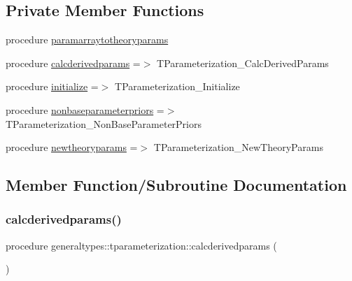 \subsection*{Private Member Functions}
\begin{DoxyCompactItemize}
\item 
procedure \mbox{\hyperlink{structgeneraltypes_1_1tparameterization_a1edd08d8a22408f2ed61517beb259921}{paramarraytotheoryparams}}
\item 
procedure \mbox{\hyperlink{structgeneraltypes_1_1tparameterization_aeb8d1b924224aecd75769d4e9c7a6d29}{calcderivedparams}} =$>$ T\+Parameterization\+\_\+\+Calc\+Derived\+Params
\item 
procedure \mbox{\hyperlink{structgeneraltypes_1_1tparameterization_ac80176866570455f25958f6d4302336d}{initialize}} =$>$ T\+Parameterization\+\_\+\+Initialize
\item 
procedure \mbox{\hyperlink{structgeneraltypes_1_1tparameterization_a7130cffde1b01791c29c0b081bd4cb5f}{nonbaseparameterpriors}} =$>$ T\+Parameterization\+\_\+\+Non\+Base\+Parameter\+Priors
\item 
procedure \mbox{\hyperlink{structgeneraltypes_1_1tparameterization_a935b504c18c4f342a4ed612364e829aa}{newtheoryparams}} =$>$ T\+Parameterization\+\_\+\+New\+Theory\+Params
\end{DoxyCompactItemize}


\subsection{Member Function/\+Subroutine Documentation}
\mbox{\label{structgeneraltypes_1_1tparameterization_aeb8d1b924224aecd75769d4e9c7a6d29}} 
\subsubsection{\texorpdfstring{calcderivedparams()}{calcderivedparams()}}
{\footnotesize\ttfamily procedure generaltypes\+::tparameterization\+::calcderivedparams (\begin{DoxyParamCaption}{ }\end{DoxyParamCaption})\hspace{0.3cm}{\ttfamily [private]}}


